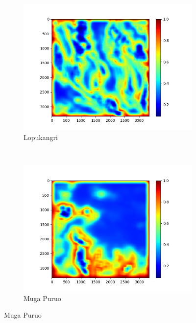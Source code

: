 \documentclass[11pt,a4paper]{article}
\begin{document}
\begin{figure}[t]
    \centering
    \begin{subfigure}[b]{0.45\textwidth}
        \includegraphics[width=\textwidth]{graphics/training/train_on_6_features_01234/heatmaps_faults_0.png}
        \caption{Lopukangri}
        \label{fig:heatmaps_3_Lopukangri}
    \end{subfigure}
    ~
    \begin{subfigure}[b]{0.45\textwidth}
        \includegraphics[width=\textwidth]{graphics/training/train_on_6_features_01234/heatmaps_faults_1.png}
        \caption{Muga Puruo}
        \label{fig:heatmaps_3_Muga_Puruo}
    \end{subfigure}


\end{figure}
\end{document}
